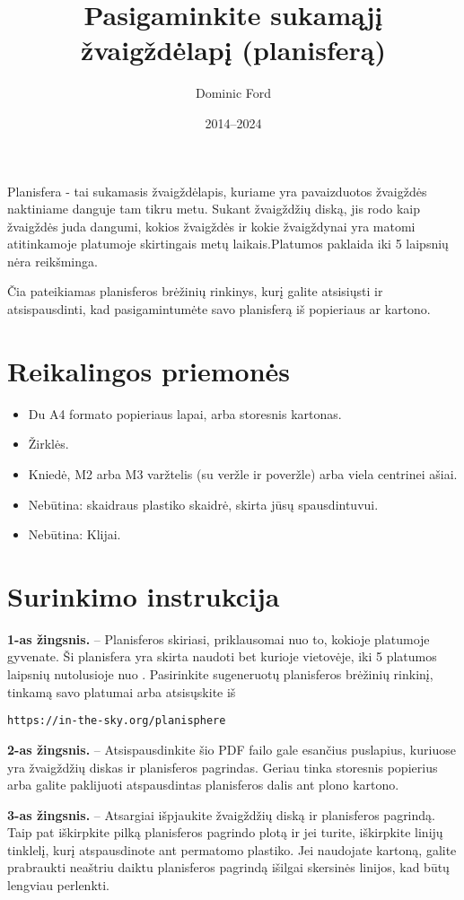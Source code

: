 \documentclass[a4paper,onecolumn,10pt]{article}
\title{Pasigaminkite sukamąjį žvaigždėlapį (planisferą)}
\author{Dominic Ford}
\date{2014--2024}
\begin{document}
\maketitle
\setcounter{footnote}{1}

Planisfera - tai sukamasis žvaigždėlapis, kuriame yra pavaizduotos žvaigždės
naktiniame danguje tam tikru metu. Sukant žvaigždžių diską, jis rodo
kaip žvaigždės juda dangumi, kokios žvaigždės ir
kokie žvaigždynai yra matomi atitinkamoje platumoje skirtingais metų laikais.Platumos paklaida iki 5 laipsnių nėra reikšminga.

Čia pateikiamas planisferos brėžinių rinkinys, kurį galite atsisiųsti ir atsispausdinti, kad pasigamintumėte savo planisferą iš popieriaus ar kartono.

\section*{Reikalingos priemonės}

\begin{itemize}
\item Du A4 formato popieriaus lapai, arba storesnis kartonas.
\item Žirklės.
\item Kniedė, M2 arba M3 varžtelis (su veržle ir poveržle) arba viela centrinei ašiai.
\item Nebūtina: skaidraus plastiko skaidrė, skirta jūsų spausdintuvui.
\item Nebūtina: Klijai.
\end{itemize}

\section*{Surinkimo instrukcija}

{\bf 1-as žingsnis.} -- Planisferos skiriasi, priklausomai nuo to, kokioje platumoje
gyvenate. Ši planisfera yra skirta naudoti bet kurioje vietovėje, iki 5 platumos laipsnių nutolusioje nuo . Pasirinkite sugeneruotų planisferos brėžinių rinkinį, tinkamą savo platumai arba atsisųskite iš

\centerline{\tt https://in-the-sky.org/planisphere}

{\bf 2-as žingsnis.} -- Atsispausdinkite šio PDF failo gale esančius puslapius, kuriuose
yra žvaigždžių diskas ir planisferos pagrindas. Geriau tinka storesnis popierius
arba galite paklijuoti atspausdintas planisferos dalis ant plono kartono.

{\bf 3-as žingsnis.} -- Atsargiai išpjaukite žvaigždžių diską ir
planisferos pagrindą. Taip pat iškirpkite pilką planisferos pagrindo plotą ir
jei turite, iškirpkite linijų tinklelį, kurį atspausdinote ant permatomo
plastiko. Jei naudojate kartoną, galite prabraukti neaštriu
daiktu planisferos pagrindą išilgai skersinės linijos, kad būtų lengviau perlenkti.
\end{document}
